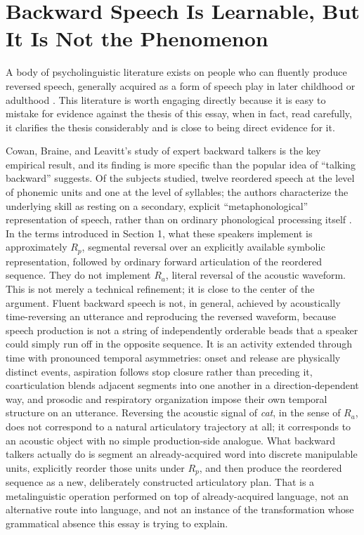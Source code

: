 \documentclass[11pt]{article}
\begin{document}
\section{Backward Speech Is Learnable, But It Is Not the Phenomenon}

A body of psycholinguistic literature exists on people who can fluently produce reversed speech, generally acquired as a form of speech play in later childhood or adulthood \citep{cowan1982,cowan1985}. This literature is worth engaging directly because it is easy to mistake for evidence against the thesis of this essay, when in fact, read carefully, it clarifies the thesis considerably and is close to being direct evidence for it.

Cowan, Braine, and Leavitt's study of expert backward talkers is the key empirical result, and its finding is more specific than the popular idea of ``talking backward'' suggests. Of the subjects studied, twelve reordered speech at the level of phonemic units and one at the level of syllables; the authors characterize the underlying skill as resting on a secondary, explicit ``metaphonological'' representation of speech, rather than on ordinary phonological processing itself \citep{cowan1985}. In the terms introduced in Section 1, what these speakers implement is approximately $R_p$, segmental reversal over an explicitly available symbolic representation, followed by ordinary forward articulation of the reordered sequence. They do not implement $R_a$, literal reversal of the acoustic waveform. This is not merely a technical refinement; it is close to the center of the argument. Fluent backward speech is not, in general, achieved by acoustically time-reversing an utterance and reproducing the reversed waveform, because speech production is not a string of independently orderable beads that a speaker could simply run off in the opposite sequence. It is an activity extended through time with pronounced temporal asymmetries: onset and release are physically distinct events, aspiration follows stop closure rather than preceding it, coarticulation blends adjacent segments into one another in a direction-dependent way, and prosodic and respiratory organization impose their own temporal structure on an utterance. Reversing the acoustic signal of \emph{cat}, in the sense of $R_a$, does not correspond to a natural articulatory trajectory at all; it corresponds to an acoustic object with no simple production-side analogue. What backward talkers actually do is segment an already-acquired word into discrete manipulable units, explicitly reorder those units under $R_p$, and then produce the reordered sequence as a new, deliberately constructed articulatory plan. That is a metalinguistic operation performed on top of already-acquired language, not an alternative route into language, and not an instance of the transformation whose grammatical absence this essay is trying to explain.
\end{document}
